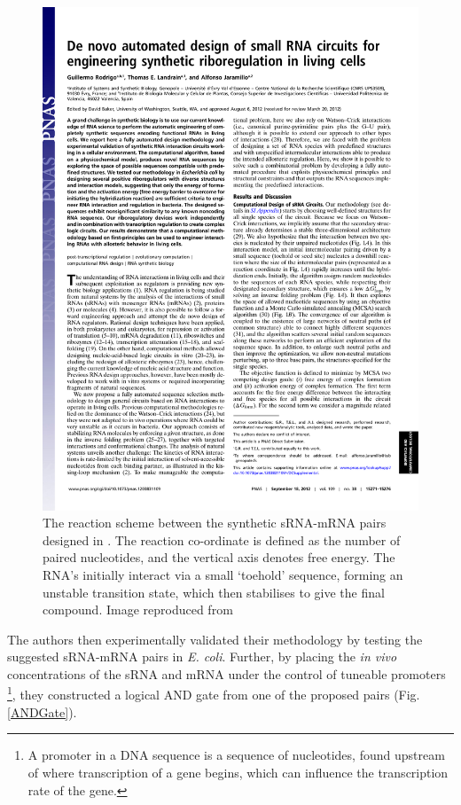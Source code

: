 \documentclass[10pt,journal]{./IEEE_latex_class/IEEEtran}
\begin{document}
\begin{figure}[h]
\centering
\includegraphics[trim = 60 630 300 30,page=2,clip = true]{pnas1203831109.pdf}
\caption{The reaction scheme between the synthetic sRNA-mRNA pairs designed in \cite{Rodrigo2012}. The reaction co-ordinate is defined as the number of paired nucleotides, and the vertical axis denotes free energy. The RNA's initially interact via a small 
`toehold' sequence, forming an unstable transition state, which then stabilises to give the final compound. Image reproduced from \cite{Rodrigo2012}}
\label{reactionscheme}
\end{figure}

The authors then experimentally validated their methodology by testing the suggested sRNA-mRNA pairs in \textit{E. coli}.  Further, by placing the \textit{in vivo}  concentrations of the sRNA and mRNA under the control of tuneable promoters \footnote{A promoter in a DNA sequence is a sequence of nucleotides, found upstream of where transcription of a gene begins, which can influence the transcription rate of the gene.}, they constructed a logical AND gate from one of the proposed pairs (Fig. \ref{ANDGate}). 
\end{document}
